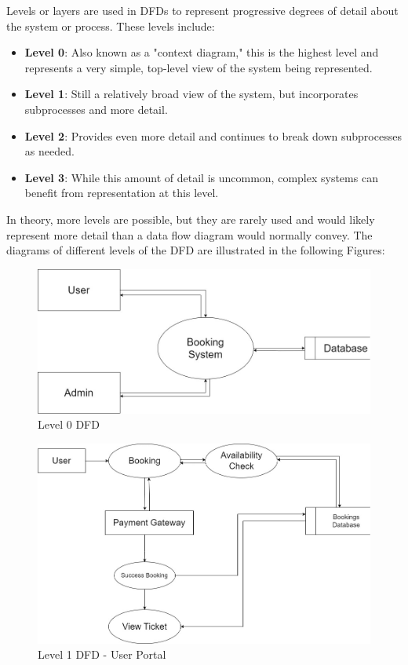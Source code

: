 \documentclass[12pt,a4paper]{report}
\begin{document}
Levels or layers are used in DFDs to represent progressive degrees of detail about the system or process. These levels include:
\begin{itemize}
    \item \textbf{Level 0}: Also known as a "context diagram," this is the highest level and represents a very simple, top-level view of the system being represented.
    \item \textbf{Level 1}: Still a relatively broad view of the system, but incorporates subprocesses and more detail.
    \item \textbf{Level 2}: Provides even more detail and continues to break down subprocesses as needed.
    \item \textbf{Level 3}: While this amount of detail is uncommon, complex systems can benefit from representation at this level.
\end{itemize}

In theory, more levels are possible, but they are rarely used and would likely represent more detail than a data flow diagram would normally convey. The diagrams of different levels of the DFD are illustrated in the following Figures:

\begin{figure}[h]
    \centering
    \includegraphics[width=\textwidth]{assets/DFD-1.jpg}
    \caption{Level 0 DFD}
    \label{dfd-1}
\end{figure}

\begin{figure}[h]
    \centering
    \includegraphics[width=\textwidth]{assets/DFD-2-User.jpg}
    \caption{Level 1 DFD - User Portal}
    \label{dfd-2-user}
\end{figure}
\end{document}
